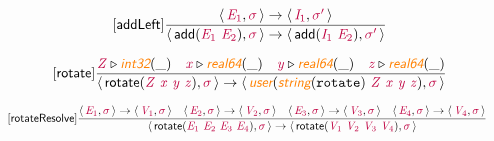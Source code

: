 \documentclass[10pt,leqno,fleqn]{article}
\newcommand{\artVariable}[1]{\mbox{\color{purple}\em #1\/}}
\newcommand{\artConstructor}[1]{\mbox{\sf #1}}
\newcommand{\artCaseInsensitiveLiteral}[1]{\mbox{\tt #1}}
\newcommand{\artSpecial}[1]{\mbox{\color{orange}\sf\em #1}}
\begin{document}
\begin{equation}
\tag*{[\artConstructor{\sf addLeft}]}
\begin{split}\frac{\langle\, \artVariable{E$_{1}$}, \artVariable{$\sigma$}\,\rangle \rightarrow \langle\, \artVariable{I$_{1}$}, \artVariable{$\sigma$\/$^\prime$}\,\rangle }{\langle\, \artConstructor{\sf add}(\artVariable{E$_{1}$}\ \artVariable{E$_{2}$}), \artVariable{$\sigma$}\,\rangle \rightarrow \langle\, \artConstructor{\sf add}(\artVariable{I$_{1}$}\ \artVariable{E$_{2}$}), \artVariable{$\sigma$\/$^\prime$}\,\rangle }
\end{split}
\end{equation}

\begin{equation}
\tag*{[\artConstructor{\sf rotate}]}
\begin{split}\frac{ \artVariable{Z}\triangleright \artSpecial{int32}(\_) \quad  \artVariable{x}\triangleright \artSpecial{real64}(\_) \quad  \artVariable{y}\triangleright \artSpecial{real64}(\_) \quad  \artVariable{z}\triangleright \artSpecial{real64}(\_) }{\langle\, \artConstructor{\sf rotate}(\artVariable{Z}\ \artVariable{x}\ \artVariable{y}\ \artVariable{z}), \artVariable{$\sigma$}\,\rangle \rightarrow \langle\, \artSpecial{user}(\artSpecial{string}(\artCaseInsensitiveLiteral{rotate})\ \artVariable{Z}\ \artVariable{x}\ \artVariable{y}\ \artVariable{z}), \artVariable{$\sigma$}\,\rangle }
\end{split}
\end{equation}

\begin{equation}
\tag*{[\artConstructor{\sf rotateResolve}]}
\begin{split}\frac{\langle\, \artVariable{E$_{1}$}, \artVariable{$\sigma$}\,\rangle \rightarrow \langle\, \artVariable{V$_{1}$}, \artVariable{$\sigma$}\,\rangle \quad \langle\, \artVariable{E$_{2}$}, \artVariable{$\sigma$}\,\rangle \rightarrow \langle\, \artVariable{V$_{2}$}, \artVariable{$\sigma$}\,\rangle \quad \langle\, \artVariable{E$_{3}$}, \artVariable{$\sigma$}\,\rangle \rightarrow \langle\, \artVariable{V$_{3}$}, \artVariable{$\sigma$}\,\rangle \quad \langle\, \artVariable{E$_{4}$}, \artVariable{$\sigma$}\,\rangle \rightarrow \langle\, \artVariable{V$_{4}$}, \artVariable{$\sigma$}\,\rangle }{\langle\, \artConstructor{\sf rotate}(\artVariable{E$_{1}$}\ \artVariable{E$_{2}$}\ \artVariable{E$_{3}$}\ \artVariable{E$_{4}$}), \artVariable{$\sigma$}\,\rangle \rightarrow \langle\, \artConstructor{\sf rotate}(\artVariable{V$_{1}$}\ \artVariable{V$_{2}$}\ \artVariable{V$_{3}$}\ \artVariable{V$_{4}$}), \artVariable{$\sigma$}\,\rangle }
\end{split}
\end{equation}
\end{document}
